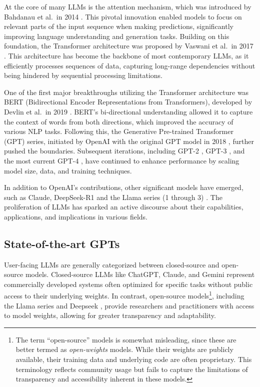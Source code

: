 \documentclass[
  a4paper,
]{scrreprt}
\theoremstyle{definition}
\theoremstyle{remark}
\begin{document}
At the core of many LLMs is the attention mechanism, which was
introduced by Bahdanau et al.~in 2014 \autocite{bahdanau2016}. This
pivotal innovation enabled models to focus on relevant parts of the
input sequence when making predictions, significantly improving language
understanding and generation tasks. Building on this foundation, the
Transformer architecture was proposed by Vaswani et al.~in 2017
\autocite{vaswani2023}. This architecture has become the backbone of
most contemporary LLMs, as it efficiently processes sequences of data,
capturing long-range dependencies without being hindered by sequential
processing limitations.

One of the first major breakthroughs utilizing the Transformer
architecture was BERT (Bidirectional Encoder Representations from
Transformers), developed by Devlin et al.~in 2019 \autocite{devlin2019}.
BERT's bi-directional understanding allowed it to capture the context of
words from both directions, which improved the accuracy of various NLP
tasks. Following this, the Generative Pre-trained Transformer (GPT)
series, initiated by OpenAI with the original GPT model in 2018
\autocite{radford2018}, further pushed the boundaries. Subsequent
iterations, including GPT-2 \autocite{radford2019}, GPT-3
\autocite{brown2020}, and the most current GPT-4 \autocite{openai2024},
have continued to enhance performance by scaling model size, data, and
training techniques.

In addition to OpenAI's contributions, other significant models have
emerged, such as Claude, DeepSeek-R1 and the Llama series (1 through 3)
\autocite{claude,deepseek-ai2025,grattafiori2024}. The proliferation of
LLMs has sparked an active discourse about their capabilities,
applications, and implications in various fields.

\subsection{State-of-the-art GPTs}\label{state-of-the-art-gpts}

User-facing LLMs are generally categorized between closed-source and
open-source models. Closed-source LLMs like ChatGPT, Claude, and Gemini
\autocite{chatgpt,claude,gemini} represent commercially developed
systems often optimized for specific tasks without public access to
their underlying weights. In contrast, open-source models\footnote{The
  term ``open-source'' models is somewhat misleading, since these are
  better termed as \emph{open-weights} models. While their weights are
  publicly available, their training data and underlying code are often
  proprietary. This terminology reflects community usage but fails to
  capture the limitations of transparency and accessibility inherent in
  these models.}, including the Llama series \autocite{grattafiori2024}
and Deepseek \autocite{deepseek-ai2025}, provide researchers and
practitioners with access to model weights, allowing for greater
transparency and adaptability.
\end{document}
